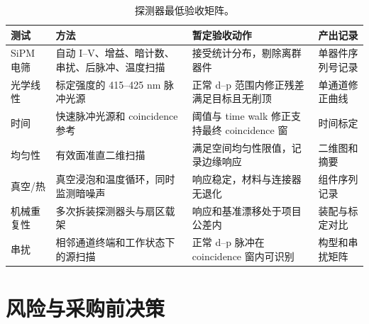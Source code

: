 \documentclass[UTF8,10pt,letterpaper,fontset=none]{ctexart}
\begin{document}
\begin{table}[htbp]
  \centering
  \scriptsize
  \caption{探测器最低验收矩阵。}
  \begin{tabularx}{\textwidth}{L{0.16\textwidth}L{0.27\textwidth}Y L{0.18\textwidth}}
    \toprule
    测试 & 方法 & 暂定验收动作 & 产出记录 \\
    \midrule
    SiPM 电筛 & 自动 I--V、增益、暗计数、串扰、后脉冲、温度扫描 &
      接受统计分布，剔除离群器件 & 单器件序列号记录 \\
    光学线性 & 标定强度的 415--425 nm 脉冲光源 &
      正常 d--p 范围内修正残差满足目标且无削顶 & 单通道修正曲线 \\
    时间 & 快速脉冲光源和 coincidence 参考 &
      阈值与 time walk 修正支持最终 coincidence 窗 & 时间标定 \\
    均匀性 & 有效面准直二维扫描 &
      满足空间均匀性限值，记录边缘响应 & 二维图和摘要 \\
    真空/热 & 真空浸泡和温度循环，同时监测暗噪声 &
      响应稳定，材料与连接器无退化 & 组件序列记录 \\
    机械重复性 & 多次拆装探测器头与扇区载架 &
      响应和基准漂移处于项目公差内 & 装配与标定对比 \\
    串扰 & 相邻通道终端和工作状态下的源扫描 &
      正常 d--p 脉冲在 coincidence 窗内可识别 & 构型和串扰矩阵 \\
    \bottomrule
  \end{tabularx}
\end{table}

\section{风险与采购前决策}
\end{document}
